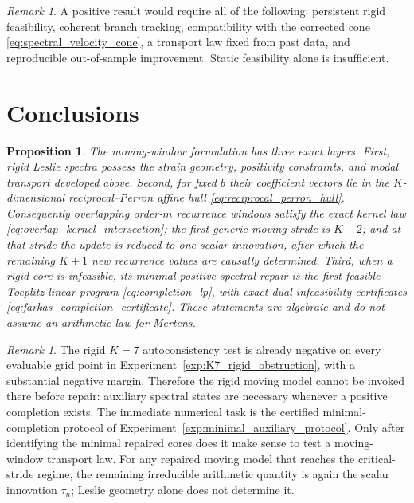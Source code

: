 \documentclass[11pt]{amsart}
\numberwithin{equation}{section}
\theoremstyle{plain}
\newtheorem{proposition}[theorem]{Proposition}
\theoremstyle{definition}
\theoremstyle{remark}
\newtheorem{remark}[theorem]{Remark}
\begin{document}
\begin{remark}
\label{rem:success}
A positive result would require all of the following: persistent rigid feasibility, coherent branch tracking, compatibility with the corrected cone \eqref{eq:spectral_velocity_cone}, a transport law fixed from past data, and reproducible out-of-sample improvement.  Static feasibility alone is insufficient.
\end{remark}

\section{Conclusions}
\label{sec:conclusions}

\begin{proposition}
\label{prop:final_conclusion}
The moving-window formulation has three exact layers.  First, rigid Leslie spectra possess the strain geometry, positivity constraints, and modal transport developed above.  Second, for fixed $b$ their coefficient vectors lie in the $K$-dimensional reciprocal--Perron affine hull \eqref{eq:reciprocal_perron_hull}.  Consequently overlapping order-$m$ recurrence windows satisfy the exact kernel law \eqref{eq:overlap_kernel_intersection}; the first generic moving stride is $K+2$; and at that stride the update is reduced to one scalar innovation, after which the remaining $K+1$ new recurrence values are causally determined.  Third, when a rigid core is infeasible, its minimal positive spectral repair is the first feasible Toeplitz linear program \eqref{eq:completion_lp}, with exact dual infeasibility certificates \eqref{eq:farkas_completion_certificate}.  These statements are algebraic and do not assume an arithmetic law for Mertens.
\end{proposition}

\begin{remark}
\label{rem:final_status}
The rigid $K=7$ autoconsistency test is already negative on every evaluable grid point in Experiment~\ref{exp:K7_rigid_obstruction}, with a substantial negative margin.  Therefore the rigid moving model cannot be invoked there before repair: auxiliary spectral states are necessary whenever a positive completion exists.  The immediate numerical task is the certified minimal-completion protocol of Experiment~\ref{exp:minimal_auxiliary_protocol}.  Only after identifying the minimal repaired cores does it make sense to test a moving-window transport law.  For any repaired moving model that reaches the critical-stride regime, the remaining irreducible arithmetic quantity is again the scalar innovation $\tau_n$; Leslie geometry alone does not determine it.
\end{remark}
\end{document}
